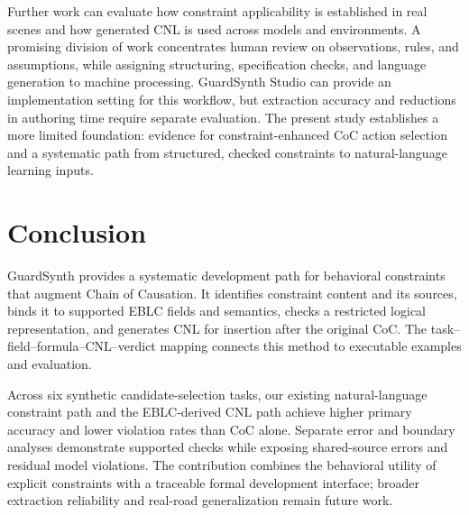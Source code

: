 \documentclass[nolineno]{ieeeaccess}
\begin{document}
Further work can evaluate how constraint applicability is established in real scenes and how generated CNL is used across models and environments. A promising division of work concentrates human review on observations, rules, and assumptions, while assigning structuring, specification checks, and language generation to machine processing. GuardSynth Studio can provide an implementation setting for this workflow, but extraction accuracy and reductions in authoring time require separate evaluation. The present study establishes a more limited foundation: evidence for constraint-enhanced CoC action selection and a systematic path from structured, checked constraints to natural-language learning inputs.\par
\section{Conclusion}

GuardSynth provides a systematic development path for behavioral constraints that augment Chain of Causation. It identifies constraint content and its sources, binds it to supported EBLC fields and semantics, checks a restricted logical representation, and generates CNL for insertion after the original CoC. The task--field--formula--CNL--verdict mapping connects this method to executable examples and evaluation.\par

Across six synthetic candidate-selection tasks, our existing natural-language constraint path and the EBLC-derived CNL path achieve higher primary accuracy and lower violation rates than CoC alone. Separate error and boundary analyses demonstrate supported checks while exposing shared-source errors and residual model violations. The contribution combines the behavioral utility of explicit constraints with a traceable formal development interface; broader extraction reliability and real-road generalization remain future work.\par
\end{document}
